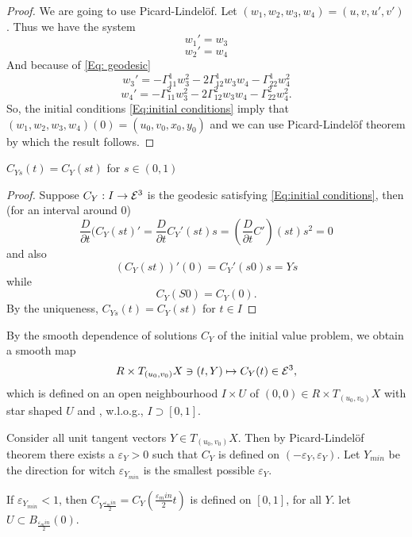 \begin{proof}
	
	We are going to use Picard-Lindelöf.
	Let $ (w_1,w_2,w_3,w_4) = (u,v,u',v') $. Thus we have the system
		\[ w_1' = w_3 \]
		\[ w_2' = w_4 \]
		And because of \ref*{Eq: geodesic}
		\[ w_3' = -\Gamma_{11}^1w_3^2 - 2 \Gamma_{12}^1 w_3w_4 -\Gamma_{22}^1 w_4^2 \]
		\[ w_4' = -\Gamma_{11}^2w_3^2 - 2 \Gamma_{12}^2 w_3w_4 -\Gamma_{22}^2 w_4^2. \]
		So, the initial conditions \ref*{Eq:initial conditions} imply that $ (w_1,w_2,w_3,w_4)(0) = (u_0,v_0,x_0,y_0) $ and we can use Picard-Lindelöf theorem by which the result follows.
	
\end{proof}

\begin{lemma}
	
	$ C_{Ys}(t) = C_Y(st) $ for $ s \in (0,1) $
	\label{lemma:I}
\end{lemma}

\begin{proof}
	
	Suppose $ C_Y: I \rightarrow \mathcal E^3 $ is the geodesic satisfying \ref*{Eq:initial conditions}, then (for an interval around $ 0 $)
		\[ \dfrac{D}{\partial t} (C_Y(st)' = \dfrac{D}{\partial t} C_Y'(st)s = (\dfrac{D}{\partial t} C') (st)s^2 = 0 \] 
	and also
		\[ (C_Y(st))'(0) = C_Y'(s0)s = Ys \]
	while
		\[ C_Y(S0) = C_Y(0). \]
	By the uniqueness, $ C_{Ys}(t) = C_Y(st) $ for $ t \in I $
\end{proof}

\begin{remark}
	By the smooth dependence of solutions $C_Y$ of the initial value problem, we obtain a smooth map 
		\[ R \times T_{(u_0,v_0)}X \ni (t,Y) \mapsto C_Y(t) \in \mathcal E^3, \]
	which is defined on an open neighbourhood $I \times U$ of $(0,0) \in R \times T_{(u_0,v_0)}X$ with star shaped $U$ and , w.l.o.g., $I \supset [0,1]$.
	
	Consider all unit tangent vectors $Y \in T_{(u_0,v_0)}X$. Then by Picard-Lindelöf theorem there exists a $\varepsilon_Y>0$ such that $C_Y$ is defined on $(-\varepsilon_Y, \varepsilon_Y)$.
	Let $Y_{min}$ be the direction for witch $\varepsilon_{Y_{min}}$ is the smallest possible $\varepsilon_Y$. 
	
	If $\varepsilon_{Y_{min}}<1$, then $C_{Y\frac {\varepsilon_min}2} = C_Y(\frac {\varepsilon_min}2 t)$ is defined on $[0,1]$, for all $Y$. let $ U \subset B_{\frac {\varepsilon_min}2}(0)$.
	\end{remark}

